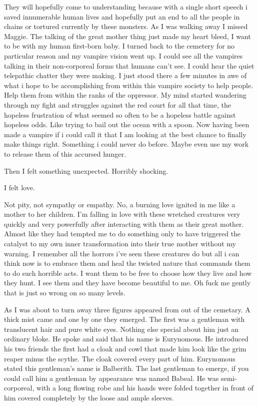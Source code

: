 They will hopefully come to understanding because with a single short speech i saved innumerable human lives and hopefully put an end to all the people in chains or tortured currently by these monsters. As I was walking away I missed Maggie. The talking of the great mother thing just made my heart bleed, I want to be with my human first-born baby. I turned back to the cemetery for no particular reason and my vampire vision went up. I could see all the vampires talking in their non-corporeal forms that humans can't see. I could hear the quiet telepathic chatter they were making. I just stood there a few minutes in awe of what i hope to be accomplishing from within this vampire society to help people. Help them from within the ranks of the oppressor. My mind started wandering through my fight and struggles against the red court for all that time, the hopeless frustration of what seemed so often to be a hopeless battle against hopeless odds. Like trying to bail out the ocean with a spoon. Now having been made a vampire if i could call it that I am looking at the best chance to finally make things right. Something i could never do before. Maybe even use my work to release them of this accursed hunger.\\
\bigskip

Then I felt something unexpected. Horribly shocking.\\
\bigskip

I felt love.\\
\bigskip

Not pity, not sympathy or empathy. No, a burning love ignited in me like a mother to her children. I'm falling in love with these wretched creatures very quickly and very powerfully after interacting with them as their great mother. Almost like they had tempted me to do something only to have triggered the catalyst to my own inner transformation into their true mother without my warning. I remember all the horrors i've seen these creatures do but all i can think now is to embrace them and heal the twisted nature that commands them to do such horrible acts. I want them to be free to choose how they live and how they hunt. I see them and they have become beautiful to me. Oh fuck me gently that is just so wrong on so many levels.

As I was about to turn away three figures appeared from out of the cemetary. A thick mist came and one by one they emerged. The first was a gentleman with translucent hair and pure white eyes. Nothing else special about him just an ordinary bloke. He spoke and said that his name is Eurynomous. He introduced his two friends the first had a cloak and cowl that made him look like the grim reaper minus the scythe. The cloak covered every part of him. Eurynomous stated this gentleman's name is Balberith. The last gentleman to emerge, if you could call him a gentleman by appearance was named Babeal. He was semi-corporeal, with a long flowing robe and his hands were folded together in front of him covered completely by the loose and ample sleeves.


